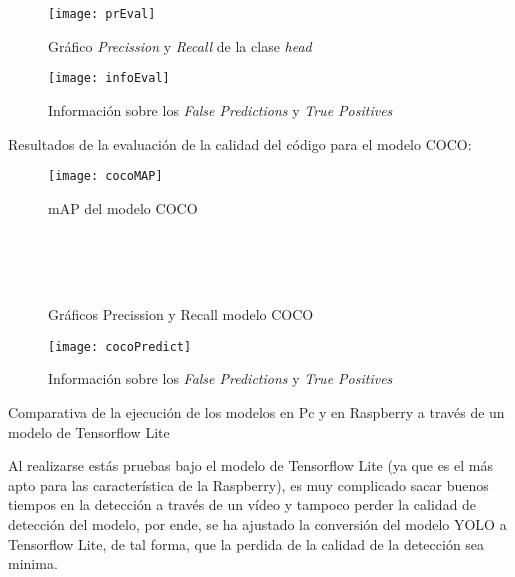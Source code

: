 \begin{figure}[!h]
    \centering
    \texttt{[image: prEval]}
    \caption{Gráfico \textit{Precission} y \textit{Recall} de la clase \textit{head}}\label{fig:prEval}

\end{figure}

\begin{figure}[!h]
    \centering
    \texttt{[image: infoEval]}
    \caption{Información sobre los \textit{False Predictions} y \textit{True Positives}}\label{fig:infoEval}
\end{figure}

\clearpage

Resultados de la evaluación de la calidad del código para el modelo COCO:
\begin{figure}[!h]
    \centering
    \texttt{[image: cocoMAP]}
    \caption{mAP del modelo COCO}\label{fig:cocoMAP}
\end{figure}

\begin{figure}[h!]
    \centering
    \\
    \\
    \\
    \caption{Gráficos Precission y Recall modelo COCO}
    \label{f:graficos precission-recall}
\end{figure}

\begin{figure}[!h]
    \centering
    \texttt{[image: cocoPredict]}
    \caption{Información sobre los \textit{False Predictions} y \textit{True Positives}}\label{fig:cocoPredict}
\end{figure}

\clearpage

Comparativa de la ejecución de los modelos en Pc y en Raspberry a través de un modelo de Tensorflow Lite

Al realizarse estás pruebas bajo el modelo de Tensorflow Lite (ya que es el más apto para las característica de la Raspberry), es muy complicado sacar buenos tiempos en la detección a través de un vídeo y tampoco perder la calidad de detección
del modelo, por ende, se ha ajustado la conversión del modelo YOLO a Tensorflow Lite, de tal forma, que la perdida de la calidad de la detección sea minima.

